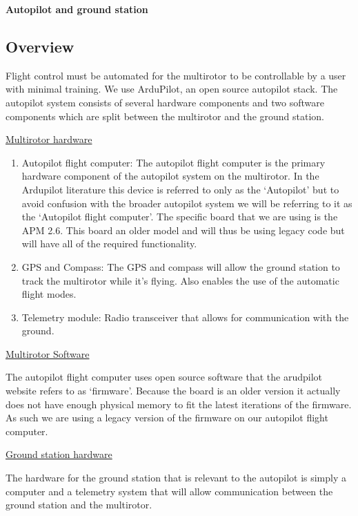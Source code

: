 \textbf{Autopilot and ground station}

\subsection{Overview}

Flight control must be automated for the multirotor to be controllable by a user with minimal training. We use ArduPilot, an open source autopilot stack. The autopilot system consists of several hardware components and two software components which are split between the multirotor and the ground station.

\underline{Multirotor hardware}\

\begin{enumerate}

    \item Autopilot flight computer: The autopilot flight computer is the primary hardware component of the autopilot system on the multirotor. In the Ardupilot literature this device is referred to only as the ‘Autopilot’ but to avoid confusion with the broader autopilot system we will be referring to it as the ‘Autopilot flight computer’. The specific board that we are using is the APM 2.6. This board an older model and will thus be using legacy code but will have all of the required functionality.
  
  \item GPS and Compass: The GPS and compass will allow the ground station to track the multirotor while it’s flying. Also enables the use of the automatic flight modes.
 
 \item Telemetry module: Radio transceiver that allows for communication with the ground.
 
\end{enumerate}

\underline{Multirotor Software}

The autopilot flight computer uses open source software that the arudpilot website refers to as ‘firmware’. Because the board is an older version it actually does not have enough physical memory to fit the latest iterations of the firmware. As such we are using a legacy version of the firmware on our autopilot flight computer.

\underline{Ground station hardware}

The hardware for the ground station that is relevant to the autopilot is simply a computer and a telemetry system that will allow communication between the ground station and the multirotor.

